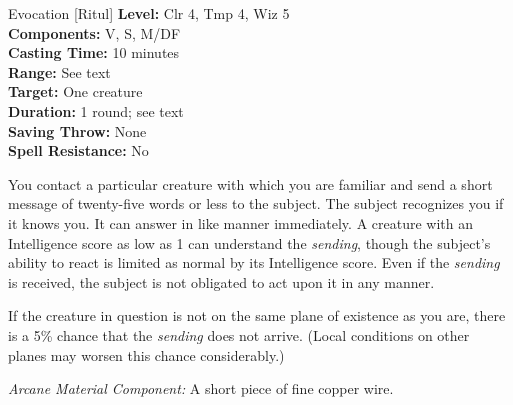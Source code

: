{Evocation [Ritul]}
{
	\textbf{Level:}
	Clr 4, Tmp 4, Wiz 5\\
	\textbf{Components:}
	V, S, M/DF\\
	\textbf{Casting Time:}
	10 minutes\\
	\textbf{Range:}
	See text\\
	\textbf{Target:}
	One creature\\
	\textbf{Duration:}
	1 round; see text\\
	\textbf{Saving Throw:}
	None\\
	\textbf{Spell Resistance:}
	No\\
}
{
	You contact a particular creature with which you are familiar and send a short message of twenty-five words or less to the subject. The subject recognizes you if it knows you. It can answer in like manner immediately. A creature with an Intelligence score as low as 1 can understand the \emph{sending}, though the subject's ability to react is limited as normal by its Intelligence score. Even if the \emph{sending} is received, the subject is not obligated to act upon it in any manner.

	If the creature in question is not on the same plane of existence as you are, there is a 5\% chance that the \emph{sending} does not arrive. (Local conditions on other planes may worsen this chance considerably.)

	\textit{Arcane Material Component:}
	A short piece of fine copper wire.

}

